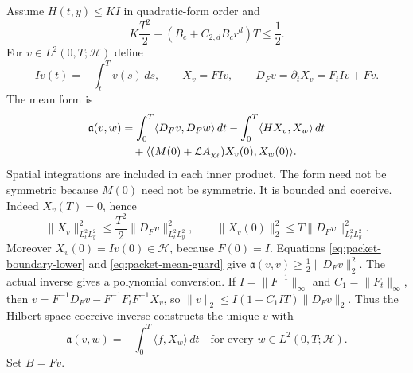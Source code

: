 Assume $H(t,y)\le K I$ in quadratic-form order and
\begin{equation}\label{eq:packet-mean-guard}
 K\frac{T^2}{2}+(B_e+C_{2,d}B_cr^d)T\le\frac12.
\end{equation}
For $v\in L^2(0,T;\mathcal H)$ define
\[
 Iv(t)=-\int_t^T v(s)\,ds,\qquad X_v=F Iv,\qquad
 D_Fv=\partial_t X_v=F_tIv+Fv.
\]
The mean form is
\begin{align}
 \mathfrak a(v,w)
 &=\int_0^T\langle D_Fv,D_Fw\rangle\,dt
   -\int_0^T\langle HX_v,X_w\rangle\,dt\notag\\
 &\quad+\langle (M(0)+\mathcal L A_{\chi_\ell})X_v(0),
                         X_w(0)\rangle.\label{eq:packet-mean-form}
\end{align}
Spatial integrations are included in each inner product. The form need
not be symmetric because $M(0)$ need not be symmetric. It is bounded and
coercive. Indeed $X_v(T)=0$, hence
\[
 \|X_v\|_{L^2_tL^2_y}^2\le\frac{T^2}{2}\|D_Fv\|_{L^2_tL^2_y}^2,
 \qquad \|X_v(0)\|_2^2\le T\|D_Fv\|_{L^2_tL^2_y}^2.
\]
Moreover $X_v(0)=Iv(0)\in\mathcal H$, because $F(0)=I$.
Equations \eqref{eq:packet-boundary-lower} and
\eqref{eq:packet-mean-guard} give
$\mathfrak a(v,v)\ge\frac12\|D_Fv\|_2^2$.
The actual inverse gives a polynomial conversion. If
$I=\|F^{-1}\|_\infty$ and $C_1=\|F_t\|_\infty$, then
$v=F^{-1}D_Fv-F^{-1}F_tF^{-1}X_v$, so
$\|v\|_2\le I(1+C_1IT)\|D_Fv\|_2$.
Thus the Hilbert-space coercive inverse constructs the unique $v$ with
\begin{equation}\label{eq:packet-mean-weak}
 \mathfrak a(v,w)=-\int_0^T\langle f,X_w\rangle\,dt
 \quad\text{for every }w\in L^2(0,T;\mathcal H).
\end{equation}
Set $B=Fv$.

